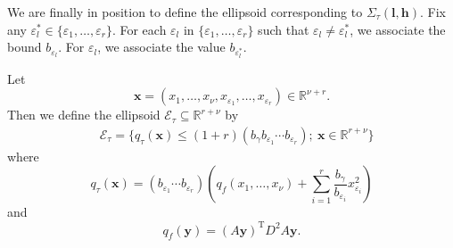 \documentclass[11pt]{report}
\theoremstyle{definition}
\newcommand{\eps}{\varepsilon}
\begin{document}
We are finally in position to define the ellipsoid corresponding to $\Sigma_{\tau}(\mathbf{l}, \mathbf{h})$. Fix any $\eps_l^* \in \{\varepsilon_1, \dots, \varepsilon_r\}$.
For each $\varepsilon_l$ in $\{\varepsilon_1, \dots, \varepsilon_r\}$ such that $\varepsilon_l \neq \varepsilon_l^*$, we associate the bound $b_{\eps_l}$. For $\varepsilon_l$, we associate the value $b_{\eps_l^*}$.
%

Let
\[\mathbf{x} = (x_1, \dots, x_{\nu}, x_{\varepsilon_1}, \dots, x_{\varepsilon_{r}}) \in \mathbb{R}^{\nu + r}.\]
Then we define the ellipsoid $\mathcal{E_\tau}\subseteq \mathbb{R}^{r+\nu}$ by
\begin{align}\label{def:ellreal}
& \mathcal{E_\tau}=\{q_\tau(\mathbf{x})\leq (1 + r)(b_{\gamma}b_{\varepsilon_1}\cdots b_{\varepsilon_r}); \ \mathbf{x}\in\mathbb{R}^{r+\nu}\}\end{align}
where
\[q_{\tau}(\mathbf{x})= (b_{\varepsilon_1}\cdots b_{\varepsilon_r})\left( q_f(x_1, \dots, x_{\nu}) + \sum_{i = 1}^r\frac{b_{\gamma}}{b_{\varepsilon_i}}x_{\varepsilon_i}^2\right)\]
and
\[q_f(\mathbf{y}) = (A\mathbf{y})^{\text{T}}D^2A\mathbf{y}.\]
\end{document}
